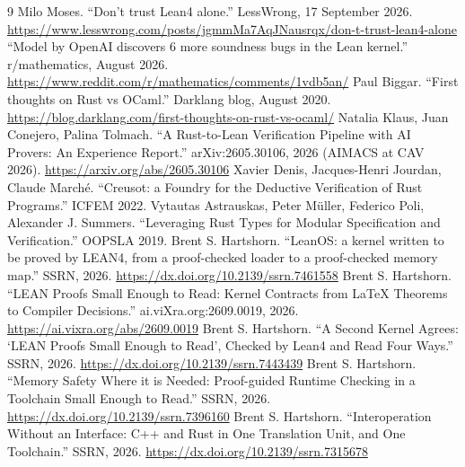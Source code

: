 \documentclass[11pt]{article}
\begin{document}
\begin{thebibliography}{9}
 Milo Moses.  ``Don't trust Lean4 alone.''  LessWrong,
  17 September 2026.
  \url{https://www.lesswrong.com/posts/jgmmMa7AqJNausrqx/don-t-trust-lean4-alone}
 ``Model by OpenAI discovers 6 more soundness bugs in
  the Lean kernel.''  r/mathematics, August 2026.
  \url{https://www.reddit.com/r/mathematics/comments/1vdb5an/}
 Paul Biggar.  ``First thoughts on Rust vs OCaml.''
  Darklang blog, August 2020.
  \url{https://blog.darklang.com/first-thoughts-on-rust-vs-ocaml/}
 Natalia Klaus, Juan Conejero, Palina Tolmach.  ``A
  Rust-to-Lean Verification Pipeline with AI Provers: An Experience
  Report.''  arXiv:2605.30106, 2026 (AIMACS at CAV 2026).
  \url{https://arxiv.org/abs/2605.30106}
 Xavier Denis, Jacques-Henri Jourdan, Claude March\'e.
  ``Creusot: a Foundry for the Deductive Verification of Rust Programs.''
  ICFEM 2022.
 Vytautas Astrauskas, Peter M\"uller, Federico Poli,
  Alexander J. Summers.  ``Leveraging Rust Types for Modular Specification
  and Verification.''  OOPSLA 2019.
 Brent S. Hartshorn.  ``LeanOS: a kernel
  written to be proved by LEAN4, from a proof-checked loader to a
  proof-checked memory map.''  SSRN, 2026.
  \url{https://dx.doi.org/10.2139/ssrn.7461558}
 Brent S. Hartshorn.  ``LEAN Proofs Small Enough
  to Read: Kernel Contracts from \LaTeX{} Theorems to Compiler Decisions.''
  ai.viXra.org:2609.0019, 2026.  \url{https://ai.vixra.org/abs/2609.0019}
 Brent S. Hartshorn.  ``A Second Kernel
  Agrees: `LEAN Proofs Small Enough to Read', Checked by Lean4 and Read Four
  Ways.''  SSRN, 2026.  \url{https://dx.doi.org/10.2139/ssrn.7443439}
 Brent S. Hartshorn.  ``Memory Safety Where
  it is Needed: Proof-guided Runtime Checking in a Toolchain Small Enough to
  Read.''  SSRN, 2026.  \url{https://dx.doi.org/10.2139/ssrn.7396160}
 Brent S. Hartshorn.  ``Interoperation
  Without an Interface: C++ and Rust in One Translation Unit, and One
  Toolchain.''  SSRN, 2026.  \url{https://dx.doi.org/10.2139/ssrn.7315678}
\end{thebibliography}
\end{document}
